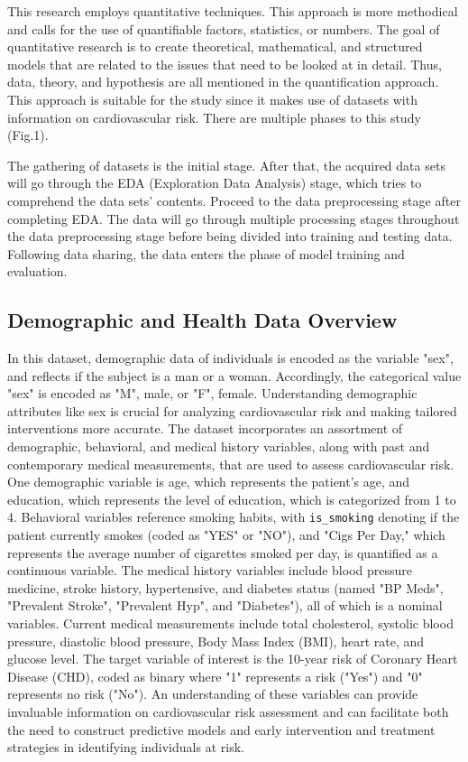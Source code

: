 \documentclass[conference]{IEEEtran}
\begin{document}
This research employs quantitative techniques. This approach is more methodical and calls for the use of quantifiable factors, statistics, or numbers. The goal of quantitative research is to create theoretical, mathematical, and structured models that are related to the issues that need to be looked at in detail. Thus, data, theory, and hypothesis are all mentioned in the quantification approach. This approach is suitable for the study since it makes use of datasets with information on cardiovascular risk. There are multiple phases to this study (Fig.1).


The gathering of datasets is the initial stage. After that, the acquired data sets will go through the EDA (Exploration Data Analysis) stage, which tries to comprehend the data sets' contents. Proceed to the data preprocessing stage after completing EDA. The data will go through multiple processing stages throughout the data preprocessing stage before being divided into training and testing data. Following data sharing, the data enters the phase of model training and evaluation.

\subsection{Demographic and Health Data Overview}
In this dataset, demographic data of individuals is encoded as the variable "sex", and reflects if the subject is a man or a woman. Accordingly, the categorical value "sex" is encoded as "M", male, or "F", female. Understanding demographic attributes like sex is crucial for analyzing cardiovascular risk and making tailored interventions more accurate. The dataset incorporates an assortment of demographic, behavioral, and medical history variables, along with past and contemporary medical measurements, that are used to assess cardiovascular risk. One demographic variable is age, which represents the patient's age, and education, which represents the level of education, which is categorized from 1 to 4. Behavioral variables reference smoking habits, with \texttt{is\_smoking} denoting if the patient currently smokes (coded as "YES" or "NO"), and "Cigs Per Day," which represents the average number of cigarettes smoked per day, is quantified as a continuous variable. The medical history variables include blood pressure medicine, stroke history, hypertensive, and diabetes status (named "BP Meds", "Prevalent Stroke", "Prevalent Hyp", and "Diabetes"), all of which is a nominal variables. Current medical measurements include total cholesterol, systolic blood pressure, diastolic blood pressure, Body Mass Index (BMI), heart rate, and glucose level. The target variable of interest is the 10-year risk of Coronary Heart Disease (CHD), coded as binary where "1" represents a risk ("Yes") and "0" represents no risk ("No"). An understanding of these variables can provide invaluable information on cardiovascular risk assessment and can facilitate both the need to construct predictive models and early intervention and treatment strategies in identifying individuals at risk.
\end{document}
